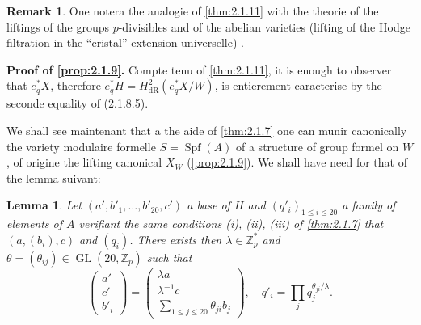 \documentclass[12pt,a4paper]{article}
\theoremstyle{plain}
\newtheorem{lemma}[theorem]{Lemma}
\theoremstyle{definition}
\newtheorem{remark}[theorem]{Remark}
\theoremstyle{remark}
\DeclareMathOperator{\Spf}{Spf}
\providecommand{\GL}{\operatorname{GL}}
\begin{document}
\begin{remark}
One notera the analogie of \ref{thm:2.1.11} with the theorie of the liftings of the groups $p$-divisibles and of the abelian varieties (lifting of the Hodge filtration in the ``cristal'' extension universelle) \cite{Messing}.
\end{remark}

\textbf{Proof of \ref{prop:2.1.9}.} Compte tenu of \ref{thm:2.1.11}, it is enough to observer that $e_q^*X$, therefore $e_q^* H = H^2_\mathrm{dR}(e_q^*X/W)$, is entierement caracterise by the seconde equality of (2.1.8.5).

We shall see maintenant that a the aide of \ref{thm:2.1.7} one can munir canonically the variety modulaire formelle $S = \Spf(A)$ of a structure of group formel on $W$, of origine the lifting canonical $X_W$ (\ref{prop:2.1.9}). We shall have need for that of the lemma suivant:

\begin{lemma}\label{lem:2.1.13}
Let $(a', b'_1, \ldots, b'_{20}, c')$ a base of $H$ and $(q'_i)_{1\leqslant i\leqslant 20}$ a family of elements of $A$ verifiant the same conditions (i), (ii), (iii) of \ref{thm:2.1.7} that $(a, (b_i), c)$ and $(q_i)$. There exists then $\lambda \in \mathbb{Z}_p^*$ and $\theta = (\theta_{ij}) \in \GL(20, \mathbb{Z}_p)$ such that
\begin{equation}\tag{2.1.13.1}
\begin{pmatrix}
a' \\ c' \\ b'_i
\end{pmatrix}
=
\begin{pmatrix}
\lambda a \\ \lambda^{-1} c \\ \displaystyle\sum_{1\leqslant j\leqslant 20} \theta_{ji} b_j
\end{pmatrix},
\quad
q'_i = \prod_j q_j^{\theta_{ji}/\lambda}. 
\end{equation}
\end{lemma}
\end{document}
